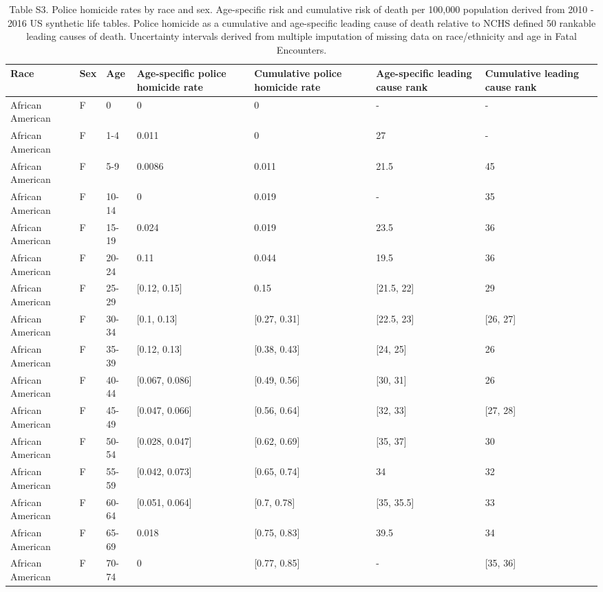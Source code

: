 \begin{table}[ht]
\centering
\caption{Table S3. Police homicide rates by race and sex. Age-specific risk and cumulative risk of death per 100,000 population derived from 2010 - 2016 US synthetic life tables. Police homicide as a cumulative and age-specific leading cause of death relative to NCHS defined 50 rankable leading causes of death. Uncertainty intervals derived from multiple imputation of missing data on race/ethnicity and age in Fatal Encounters.} 
\begin{tabular}{lllllll}
  \hline
Race & Sex & Age & Age-specific police homicide rate & Cumulative police homicide rate & Age-specific leading cause rank & Cumulative leading cause rank \\ 
  \hline
African American & F & 0 & 0 & 0 & - & - \\ 
  African American & F & 1-4 & 0.011 & 0 & 27 & - \\ 
  African American & F & 5-9 & 0.0086 & 0.011 & 21.5 & 45 \\ 
  African American & F & 10-14 & 0 & 0.019 & - & 35 \\ 
  African American & F & 15-19 & 0.024 & 0.019 & 23.5 & 36 \\ 
  African American & F & 20-24 & 0.11 & 0.044 & 19.5 & 36 \\ 
  African American & F & 25-29 & [0.12, 0.15] & 0.15 & [21.5, 22] & 29 \\ 
  African American & F & 30-34 & [0.1, 0.13] & [0.27, 0.31] & [22.5, 23] & [26, 27] \\ 
  African American & F & 35-39 & [0.12, 0.13] & [0.38, 0.43] & [24, 25] & 26 \\ 
  African American & F & 40-44 & [0.067, 0.086] & [0.49, 0.56] & [30, 31] & 26 \\ 
  African American & F & 45-49 & [0.047, 0.066] & [0.56, 0.64] & [32, 33] & [27, 28] \\ 
  African American & F & 50-54 & [0.028, 0.047] & [0.62, 0.69] & [35, 37] & 30 \\ 
  African American & F & 55-59 & [0.042, 0.073] & [0.65, 0.74] & 34 & 32 \\ 
  African American & F & 60-64 & [0.051, 0.064] & [0.7, 0.78] & [35, 35.5] & 33 \\ 
  African American & F & 65-69 & 0.018 & [0.75, 0.83] & 39.5 & 34 \\ 
  African American & F & 70-74 & 0 & [0.77, 0.85] & - & [35, 36] \\ 

\end{tabular}
\end{table}
